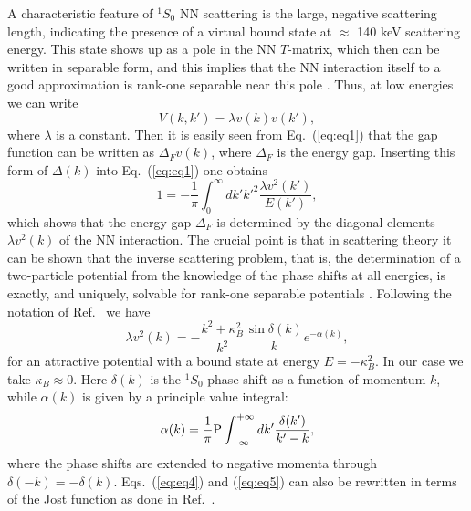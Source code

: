 \begin{multicols}{2}
A characteristic feature of $^1S_0$ NN scattering is the large, negative 
scattering length, indicating the presence of  
a virtual bound state at $\approx$ 140 keV scattering energy.  
This state shows up as a pole in the NN $T$-matrix, 
which then  can be written in separable form, 
and this implies that the NN interaction itself to a good approximation is 
rank-one separable near this pole \cite{brown76}.   
Thus, at low energies we can write 
\begin{equation}
       V(k,k')=\lambda v(k)v(k'),
       \label{eq:eq2}
\end{equation}
where $\lambda$ is a constant.  Then it is easily seen from 
Eq.\ (\ref{eq:eq1}) that the gap function can be written as $\Delta_F v(k)$, 
where $\Delta_F$ is the energy gap.  Inserting this form of 
$\Delta(k)$ into Eq.\ (\ref{eq:eq1}) one obtains 
\begin{equation}
      1=-\frac{1}{\pi}\int_{0}^{\infty}dk'k'^2\frac{\lambda v^2(k')}{E(k')}, 
      \label{eq:eq3}
\end{equation}
which shows that the energy gap $\Delta_F$ is 
determined by the diagonal elements $\lambda v^2(k)$ of the NN interaction.  
The crucial point is that in scattering theory it can be shown that 
the inverse scattering problem, that is, the determination of a 
two-particle potential from the knowledge of the phase shifts at all 
energies, is exactly, and uniquely, solvable for rank-one 
separable potentials \cite{brown76,chadan92}.  Following the notation 
of Ref.\ \cite{brown76} we have 
\begin{equation}
       \lambda v^2(k)=-\frac{k^2+\kappa_B^2}{k^2}
                       \frac{\sin \delta(k)}{k}e^{-\alpha(k)},
       \label{eq:eq4}
\end{equation}
for an attractive potential with a bound state at energy $E=-\kappa_B^2$. 
In our case we take  $\kappa_B\approx 0$.    
Here $\delta(k)$ is the $^1S_0$ phase shift as a function of momentum $k$, 
while $\alpha(k)$ is given by a principle value integral: 
\begin{equation}
       \alpha(k)=\frac{1}{\pi}{\rm P}\int_{-\infty}^{+\infty}dk'
                 \frac{\delta(k')}{k'-k},
       \label{eq:eq5}
\end{equation}
where the phase shifts are extended to negative momenta through 
$\delta(-k)=-\delta(k)$.  Eqs.\ (\ref{eq:eq4}) and (\ref{eq:eq5}) 
can also be rewritten in terms of the Jost function \cite{chadan92}  
as done in Ref.\ \cite{kk97}.


\end{multicols}
